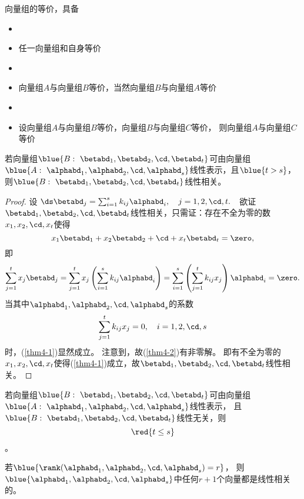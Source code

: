 向量组的等价，具备
\begin{itemize}
\item {}
\item[] 任一向量组和自身等价  
\item {}
\item[] 向量组$A$与向量组$B$等价，当然向量组$B$与向量组$A$等价  
\item {}
\item[] 设向量组$A$与向量组$B$等价，向量组$B$与向量组$C$等价，
  则向量组$A$与向量组$C$等价
\end{itemize} 






\begin{dingli}
  若向量组$\blue{B:~\betabd_1,\betabd_2,\cd,\betabd_t}$可由向量组$\blue{A:~\alphabd_1,\alphabd_2,\cd,\alphabd_s}$线性表示，且$\blue{t>s}$，
  则$\blue{B:~\betabd_1,\betabd_2,\cd,\betabd_t}$线性相关。
\end{dingli}

\begin{proof}
设
$
\ds \betabd_j=\sum_{i=1}^sk_{ij}\alphabd_i, \quad j=1,2,\cd,t.~~
$  
欲证$\betabd_1,\betabd_2,\cd,\betabd_t$线性相关，只需证：存在不全为零的数$x_1,x_2,\cd,x_t$使得
\begin{equation}\label{thm4-1}
  x_1\betabd_1+x_2\betabd_2+\cd+x_t\betabd_t=\zero,
\end{equation}     
即
$$
\sum_{j=1}^t x_j \betabd_j = \sum_{j=1}^t x_j\left(\sum_{i=1}^sk_{ij}\alphabd_i\right)
= \sum_{i=1}^s\left(\sum_{j=1}^t k_{ij} x_j \right)  \alphabd_i = \zero.
$$  
当其中$\alphabd_1,\alphabd_2,\cd,\alphabd_s$的系数
\begin{equation}\label{thm4-2}
  \sum_{j=1}^tk_{ij}x_j = 0, \quad i=1,2,\cd,s
\end{equation}
时，(\ref{thm4-1})显然成立。 
注意到，故(\ref{thm4-2})有非零解。 即有不全为零的$x_1,x_2,\cd,x_t$使得(\ref{thm4-1})成立，故$\betabd_1,\betabd_2,\cd,\betabd_t$线性相关。
\end{proof}


\begin{tuilun}
  若向量组$\blue{B:~\betabd_1,\betabd_2,\cd,\betabd_t}$可由向量组$\blue{A:~\alphabd_1,\alphabd_2,\cd,\alphabd_s}$线性表示，
  且$\blue{B:~\betabd_1,\betabd_2,\cd,\betabd_t}$线性无关，则
  $$\red{t\le s}$$。
\end{tuilun}


\begin{tuilun}
  若$\blue{\rank(\alphabd_1,\alphabd_2,\cd,\alphabd_s)=r}$，
  则$\blue{\alphabd_1,\alphabd_2,\cd,\alphabd_s}$中任何$r+1$个向量都是线性相关的。
\end{tuilun}
 
